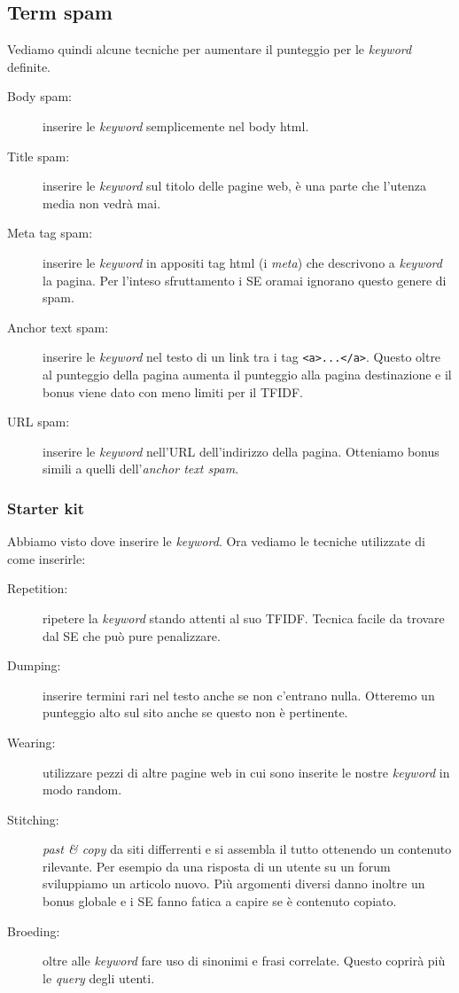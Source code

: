 		\subsection{Term spam}
			Vediamo quindi alcune tecniche per aumentare il punteggio per le \emph{keyword} definite.
			\begin{description}
				\item[Body spam:] inserire le \emph{keyword} semplicemente nel body html.
				\item[Title spam:] inserire le \emph{keyword} sul titolo delle pagine web, è una parte che l'utenza media non vedrà mai.
				\item[Meta tag spam:] inserire le \emph{keyword} in appositi tag html (i \emph{meta}) che descrivono a \emph{keyword} la pagina. Per l'inteso sfruttamento i SE oramai ignorano questo genere di spam.
				\item[Anchor text spam:] inserire le \emph{keyword} nel testo di un link tra i tag \verb|<a>...</a>|. Questo oltre al punteggio della pagina aumenta il punteggio alla pagina destinazione e il bonus viene dato con meno limiti per il TFIDF.
				\item[URL spam:] inserire le \emph{keyword} nell'URL dell'indirizzo della pagina. Otteniamo bonus simili a quelli dell'\emph{anchor text spam}.
			\end{description}
			
		
			\subsubsection{Starter kit}
				Abbiamo visto dove inserire le \emph{keyword}. Ora vediamo le tecniche utilizzate di come inserirle:
				\begin{description}
					\item[Repetition:] ripetere la \emph{keyword} stando attenti al suo TFIDF. Tecnica facile da trovare dal SE che può pure penalizzare.
					\item[Dumping:] inserire termini rari nel testo anche se non c'entrano nulla. Otteremo un punteggio alto sul sito anche se questo non è pertinente.
					\item[Wearing:] utilizzare pezzi di altre pagine web in cui sono inserite le nostre \emph{keyword} in modo random.
					\item[Stitching:] \emph{past \& copy} da siti differrenti e si assembla il tutto ottenendo un contenuto rilevante. Per esempio da una risposta di un utente su un forum sviluppiamo un articolo nuovo. Più argomenti diversi danno inoltre un bonus globale e i SE fanno fatica a capire se è contenuto copiato.
					\item[Broeding:] oltre alle \emph{keyword} fare uso di sinonimi e frasi correlate. Questo coprirà più le \emph{query} degli utenti.
				\end{description}		
		
